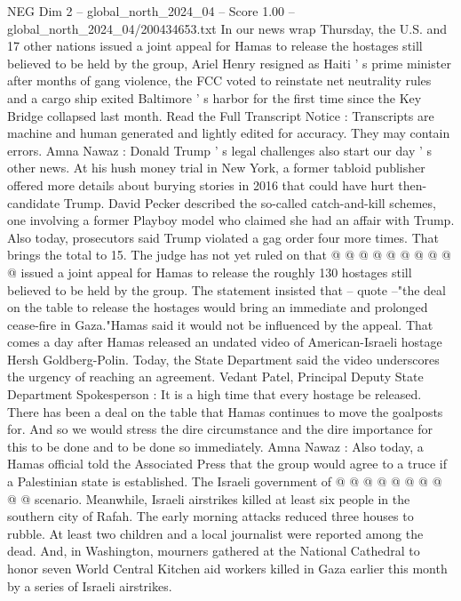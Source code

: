 \begin{textsample}{NEG Dim 2 – global\_north\_2024\_04 – Score 1.00 – global\_north\_2024\_04/200434653.txt}  \label{ex:f2_neg_276}
In our news wrap Thursday, the U.S. and 17 other nations issued a joint appeal for Hamas to release the hostages still believed to be held by the group, Ariel Henry resigned as Haiti ' s prime minister after months of gang violence, the FCC voted to reinstate net neutrality rules and a cargo ship exited Baltimore ' s harbor for the first time since the Key Bridge collapsed last month.
Read the Full Transcript Notice : Transcripts are machine and human generated and lightly edited for accuracy.
They may contain errors.
Amna Nawaz : Donald Trump ' s legal challenges also start our day ' s other news.
At his hush money trial in New York, a former tabloid publisher offered more details about burying stories in 2016 that could have hurt then-candidate Trump.
David Pecker described the so-called catch-and-kill schemes, one involving a former Playboy model who claimed she had an affair with Trump.
Also today, prosecutors said Trump violated a gag order four more times.
That brings the total to 15.
The judge has not yet ruled on that @ @ @ @ @ @ @ @ @ @ issued a joint appeal for Hamas to release the roughly 130 hostages still believed to be held by the group.
The statement insisted that -- quote --"the deal on the table to release the hostages would bring an immediate and prolonged cease-fire in Gaza."Hamas said it would not be influenced by the appeal.
That comes a day after Hamas released an undated video of American-Israeli hostage Hersh Goldberg-Polin.
Today, the State Department said the video underscores the urgency of reaching an agreement.
Vedant Patel, Principal Deputy State Department Spokesperson : It is a high time that every hostage be released.
There has been a deal on the table that Hamas continues to move the goalposts for.
And so we would stress the dire circumstance and the dire importance for this to be done and to be done so immediately.
Amna Nawaz : Also today, a Hamas official told the Associated Press that the group would agree to a truce if a Palestinian state is established.
The Israeli government of @ @ @ @ @ @ @ @ @ @ scenario.
Meanwhile, Israeli airstrikes killed at least six people in the southern city of Rafah.
The early morning attacks reduced three houses to rubble.
At least two children and a local journalist were reported among the dead.
And, in Washington, mourners gathered at the National Cathedral to honor seven World Central Kitchen aid workers killed in Gaza earlier this month by a series of Israeli airstrikes.

\end{textsample}
